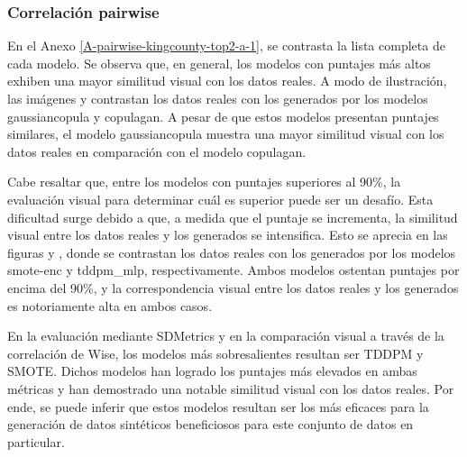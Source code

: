 \newpage

\subsubsection{Correlación pairwise}

En el Anexo \ref{A-pairwise-kingcounty-top2-a-1}, se contrasta la lista completa de cada modelo. Se observa que, en general, los modelos con puntajes más altos exhiben una mayor similitud visual con los datos reales. A modo de ilustración, las imágenes  y  contrastan los datos reales con los generados por los modelos gaussiancopula y copulagan. A pesar de que estos modelos presentan puntajes similares, el modelo gaussiancopula muestra una mayor similitud visual con los datos reales en comparación con el modelo copulagan.





\newpage 
Cabe resaltar que, entre los modelos con puntajes superiores al 90\%, la evaluación visual para determinar cuál es superior puede ser un desafío. Esta dificultad surge debido a que, a medida que el puntaje se incrementa, la similitud visual entre los datos reales y los generados se intensifica. Esto se aprecia en las figuras  y , donde se contrastan los datos reales con los generados por los modelos smote-enc y tddpm\_mlp, respectivamente. Ambos modelos ostentan puntajes por encima del 90\%, y la correspondencia visual entre los datos reales y los generados es notoriamente alta en ambos casos.




En la evaluación mediante SDMetrics y en la comparación visual a través de la correlación de Wise, los modelos más sobresalientes resultan ser TDDPM y SMOTE. Dichos modelos han logrado los puntajes más elevados en ambas métricas y han demostrado una notable similitud visual con los datos reales. Por ende, se puede inferir que estos modelos resultan ser los más eficaces para la generación de datos sintéticos beneficiosos para este conjunto de datos en particular.

